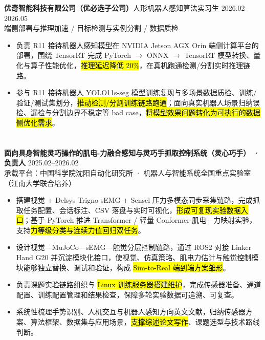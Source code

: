 \vspace{0.30em}
{\small\textbf{优奇智能科技有限公司（优必选子公司）}}\quad 人形机器人感知算法实习生 \hfill {2026.02--2026.05} \\
{\scriptsize\color{WHU_Blue} 端侧部署与推理加速 / 目标检测与实例分割 / 数据质检}
\begin{itemize}
    \item 负责 R11 接待机器人感知模型在 NVIDIA Jetson AGX Orin 端侧计算平台的部署，围绕 TensorRT 完成 PyTorch $\rightarrow$ ONNX $\rightarrow$ TensorRT 模型转换、量化与算子性能优化，\hl{推理延迟降低 20\%}，在真机跑通检测/分割实时推理链路。
    \item 参与 R11 接待机器人 YOLO11s-seg 模型训练复现与多场景数据质检、训练/验证/测试集划分，\hl{推动检测/分割训练链路跑通}；面向真实机器人场景归纳误检、漏检与分割边界不稳定等 bad case，\hl{将模型效果问题转化为可执行的数据侧优化需求}。
\end{itemize}

\section[科研与项目经历]{}
{\small\textbf{面向具身智能灵巧操作的肌电-力融合感知与灵巧手抓取控制系统（灵心巧手） · 负责人}} \hfill {2025.02--2026.02}\\
{\scriptsize\color{WHU_Blue} 承载平台：中国科学院沈阳自动化研究所 · 机器人与智能系统全国重点实验室（江南大学联合培养）}
\begin{itemize}
    \item 搭建视觉 + Delsys Trigno sEMG + Sensel 压力多模态同步采集链路，完成抓取任务配置、会话标注、CSV 落盘与实时可视化，\hl{形成可复现实验数据入口}；基于 PyTorch 推进 Transformer / 轻量 Conformer 肌电—力映射实验，支持\hl{力等级分类与连续力值回归双任务}。
    \item 设计视觉—MuJoCo—sEMG—触觉分层控制链路，通过 ROS2 对接 Linker Hand G20 并沉淀模块化接口，使视觉、仿真策略、肌电力估计与触觉控制模块能够独立替换、调试和验证，构成 \hl{Sim-to-Real 端到端方案雏形}。
    \item 负责课题实验链路组织与 \hl{Linux 训练服务器搭建维护}，完成传感器准备、通道配置、训练配置管理和结果检查，保障多轮实验数据可追溯、可复查。
    \item 系统性梳理手势识别、人机交互与机器人感知方向英文文献，归纳传感器方案、算法框架、数据集与应用场景，\hl{支撑综述论文写作}、课题选型与技术路线判断。
\end{itemize}

